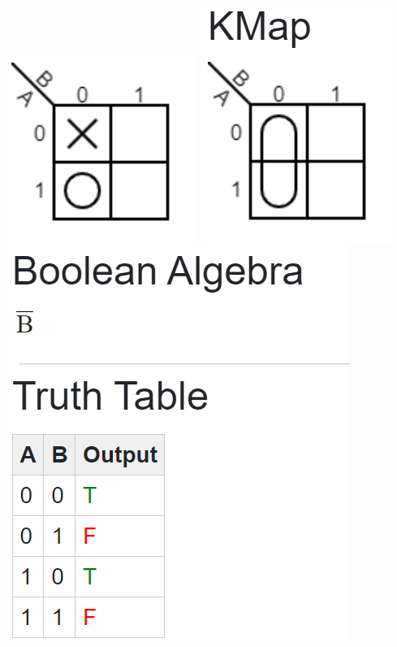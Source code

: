 \documentclass[10pt]{article}
\begin{document}
\begin{itemize}
\begin{enumerate}
\includegraphics[scale=.8]{Problem7kmap.png}
\includegraphics[scale=.8]{Problem7minimized.png}
\includegraphics[scale=.6]{Problem7algebra.png}

\end{enumerate}
\end{itemize}
\end{document}
